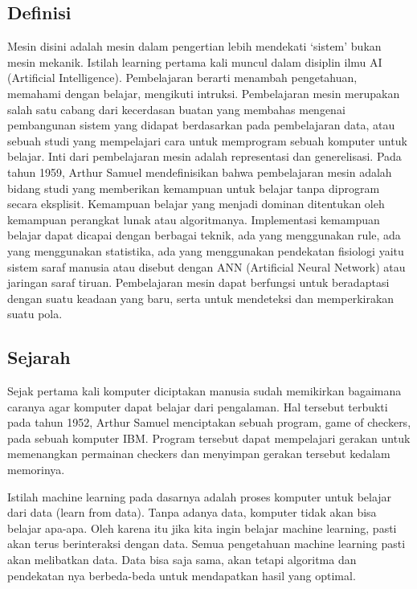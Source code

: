 \subsection{Definisi}
 Mesin disini adalah mesin dalam pengertian lebih mendekati ‘sistem’ bukan mesin mekanik. Istilah learning pertama kali muncul dalam disiplin ilmu AI (Artificial Intelligence). Pembelajaran berarti menambah pengetahuan, memahami dengan belajar, mengikuti intruksi. Pembelajaran mesin merupakan salah satu cabang dari kecerdasan buatan yang membahas mengenai pembangunan sistem yang didapat berdasarkan pada pembelajaran data, atau sebuah studi yang mempelajari cara untuk memprogram sebuah komputer untuk belajar. Inti dari pembelajaran mesin adalah representasi dan generelisasi. Pada tahun 1959, Arthur Samuel mendefinisikan bahwa pembelajaran mesin adalah bidang studi yang memberikan kemampuan untuk belajar tanpa diprogram secara eksplisit. Kemampuan belajar yang menjadi dominan ditentukan oleh kemampuan perangkat lunak atau algoritmanya. Implementasi kemampuan belajar dapat dicapai dengan berbagai teknik, ada yang menggunakan rule, ada yang menggunakan statistika, ada yang menggunakan pendekatan fisiologi yaitu sistem saraf manusia atau disebut dengan ANN (Artificial Neural Network) atau jaringan saraf tiruan. Pembelajaran mesin dapat berfungsi untuk beradaptasi dengan suatu keadaan yang baru, serta untuk mendeteksi dan memperkirakan suatu pola.

\subsection{Sejarah}
 Sejak pertama kali komputer diciptakan manusia sudah memikirkan bagaimana caranya agar komputer dapat belajar dari pengalaman. Hal tersebut terbukti pada tahun 1952, Arthur Samuel menciptakan sebuah program, game of checkers, pada sebuah komputer IBM. Program tersebut dapat mempelajari gerakan untuk memenangkan permainan checkers dan menyimpan gerakan tersebut kedalam memorinya.
\par Istilah machine learning pada dasarnya adalah proses komputer untuk belajar dari data (learn from data). Tanpa adanya data, komputer tidak akan bisa belajar apa-apa. Oleh karena itu jika kita ingin belajar machine learning, pasti akan terus berinteraksi dengan data. Semua pengetahuan machine learning pasti akan melibatkan data. Data bisa saja sama, akan tetapi algoritma dan pendekatan nya berbeda-beda untuk mendapatkan hasil yang optimal.

